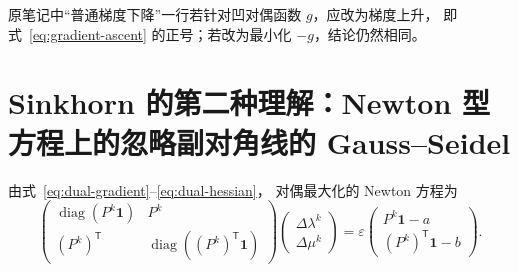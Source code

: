 \documentclass[11pt,a4paper]{ctexart}
\newcommand{\diag}{\operatorname{diag}}
\newcommand{\vone}{\bm{1}}
\newcommand{\trans}{\mathsf{T}}
\begin{document}
\begin{checknote}
原笔记中“普通梯度下降”一行若针对凹对偶函数 $g$，应改为梯度上升，
即式~\eqref{eq:gradient-ascent} 的正号；若改为最小化 $-g$，结论仍然相同。
\end{checknote}

\section{Sinkhorn 的第二种理解：Newton 型方程上的忽略副对角线的 Gauss--Seidel}

由式~\eqref{eq:dual-gradient}--\eqref{eq:dual-hessian}，
对偶最大化的 Newton 方程为
\begin{equation}\label{eq:newton-lambda-mu}
  \begin{pmatrix}
    \diag(P^k\vone) & P^k\\
    (P^k)^{\trans} & \diag((P^k)^{\trans}\vone)
  \end{pmatrix}
  \begin{pmatrix}
    \Delta\lambda^k\\[0.2em]
    \Delta\mu^k
  \end{pmatrix}
  =\varepsilon
  \begin{pmatrix}
    P^k\vone-a\\[0.2em]
    (P^k)^{\trans}\vone-b
  \end{pmatrix}.
\end{equation}
\end{document}
